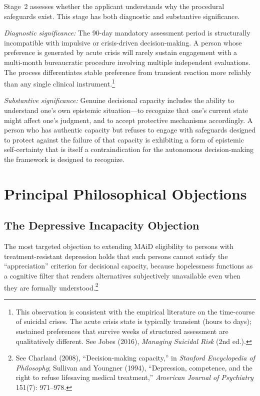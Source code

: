\documentclass[11pt, letterpaper]{article}
\begin{document}
Stage~2 assesses whether the applicant understands why the procedural safeguards exist.
This stage has both diagnostic and substantive significance.

\textit{Diagnostic significance:} The 90-day mandatory assessment period is structurally
incompatible with impulsive or crisis-driven decision-making. A person whose preference
is generated by acute crisis will rarely sustain engagement with a multi-month
bureaucratic procedure involving multiple independent evaluations. The process
differentiates stable preference from transient reaction more reliably than any single
clinical instrument.\footnote{%
  This observation is consistent with the empirical literature on the time-course of
  suicidal crises. The acute crisis state is typically transient (hours to days);
  sustained preferences that survive weeks of structured assessment are qualitatively
  different. See Jobes (2016), \textit{Managing Suicidal Risk} (2nd ed.).}

\textit{Substantive significance:} Genuine decisional capacity includes the ability to
understand one's own epistemic situation---to recognize that one's current state might
affect one's judgment, and to accept protective mechanisms accordingly. A person who
has authentic capacity but refuses to engage with safeguards designed to protect
against the failure of that capacity is exhibiting a form of epistemic self-certainty
that is itself a contraindication for the autonomous decision-making the framework
is designed to recognize.

\section{Principal Philosophical Objections}

\subsection{The Depressive Incapacity Objection}

The most targeted objection to extending MAiD eligibility to persons with
treatment-resistant depression holds that such persons cannot satisfy the
``appreciation'' criterion for decisional capacity, because hopelessness functions
as a cognitive filter that renders alternatives subjectively unavailable even when
they are formally understood.\footnote{%
  See Charland (2008), ``Decision-making capacity,'' in
  \textit{Stanford Encyclopedia of Philosophy}; Sullivan and Youngner (1994),
  ``Depression, competence, and the right to refuse lifesaving medical treatment,''
  \textit{American Journal of Psychiatry} 151(7): 971--978.}
\end{document}
